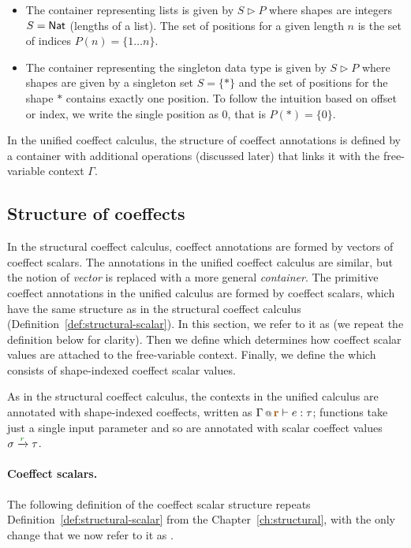 \begin{itemize}
\item The container representing lists is given by $S \triangleright P$ where
  shapes are integers $S = \ident{Nat}$ (lengths of a list). The set of positions for a
  given length $n$ is the set of indices $P(n)= \{ 1 \ldots n \}$.

\item The container representing the singleton data type is given by $S \triangleright P$ where
  shapes are given by a singleton set $S = \{ \ast \}$ and the set of positions for the
  shape $\ast$ contains exactly one position. To follow the intuition based on offset or
  index, we write the single position as $0$, that is $P(\ast) = \{ 0 \}$.
\end{itemize}

\noindent
In the unified coeffect calculus, the structure of coeffect annotations is defined by a
container with additional operations (discussed later) that links it with the free-variable
context $\Gamma$.

\subsection{Structure of coeffects}
In the structural coeffect calculus, coeffect annotations are formed by vectors of coeffect
scalars. The annotations in the unified coeffect calculus are similar, but the notion of \emph{vector}
is replaced with a more general \emph{container}. The primitive coeffect annotations in the unified
calculus are formed by coeffect scalars, which have the same structure as in the structural
coeffect calculus (Definition~\ref{def:structural-scalar}). In this section, we refer to it as
\emph{} (we repeat the definition below for clarity).
Then we define \emph{} which determines how coeffect
scalar values are attached to the free-variable context. Finally, we define the
\emph{} which consists of shape-indexed coeffect scalar values.

As in the structural coeffect calculus, the contexts in the unified calculus are annotated with
shape-indexed coeffects, written as $\coctx{\Gamma}{\aclrd{\textbf{r}}} \vdash e : \tau$;
functions take just a single input parameter and so are annotated with scalar coeffect values
$\sigma \xrightarrow{\cclrd{r}} \tau$.

\paragraph{Coeffect scalars.}
The following definition of the coeffect scalar structure repeats
Definition~\ref{def:structural-scalar} from the Chapter~\ref{ch:structural}, with the only change
that we now refer to it as \emph{}.

